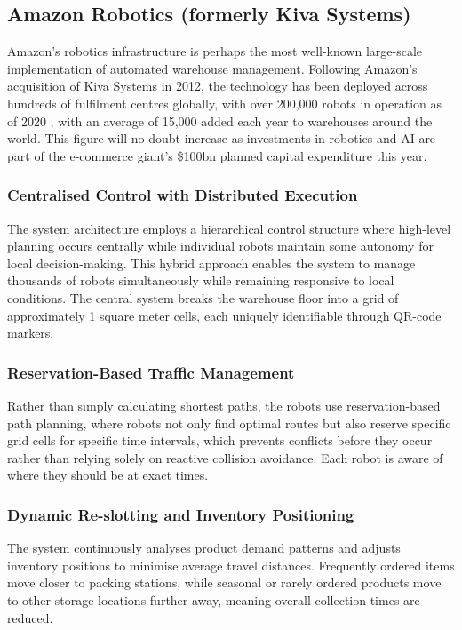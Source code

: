 \subsection{Amazon Robotics (formerly Kiva Systems)}

Amazon's robotics infrastructure is perhaps the most well-known large-scale implementation of automated warehouse management. Following Amazon's acquisition of Kiva Systems in 2012, the technology has been deployed across hundreds of fulfilment centres globally, with over 200,000 robots in operation as of 2020 \cite{edwards_2020_amazon}, with an average of 15,000 added each year to warehouses around the world. This figure will no doubt increase as investments in robotics and AI are part of the e-commerce giant’s \$100bn planned capital expenditure this year. \cite{clifford_2025_amazon}

\subsubsection{Centralised Control with Distributed Execution}
The system architecture employs a hierarchical control structure where high-level planning occurs centrally while individual robots maintain some autonomy for local decision-making. This hybrid approach enables the system to manage thousands of robots simultaneously while remaining responsive to local conditions. The central system breaks the warehouse floor into a grid of approximately 1 square meter cells, each uniquely identifiable through QR-code markers.

\subsubsection{Reservation-Based Traffic Management}
Rather than simply calculating shortest paths, the robots use reservation-based path planning, where robots not only find optimal routes but also reserve specific grid cells for specific time intervals, which prevents conflicts before they occur rather than relying solely on reactive collision avoidance. Each robot is aware of where they should be at exact times.

\subsubsection{Dynamic Re-slotting and Inventory Positioning}
The system continuously analyses product demand patterns and adjusts inventory positions to minimise average travel distances. Frequently ordered items move closer to packing stations, while seasonal or rarely ordered products move to other storage locations further away, meaning overall collection times are reduced.

